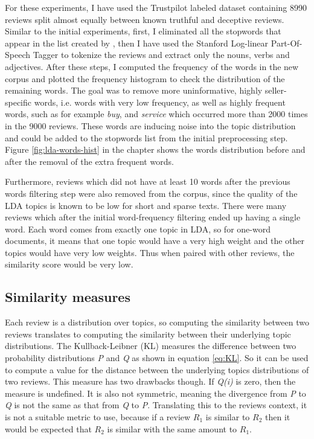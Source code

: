 For these experiments, I have used the Trustpilot labeled dataset containing 8990 reviews split almost equally between known truthful and deceptive reviews. Similar to the initial experiments, first, I eliminated all the stopwords that appear in the list created by  \citet{SaltonandBuckleyStopWordsAggresive}, then I have used the Stanford Log-linear Part-Of-Speech Tagger \citet{StanfordNLPTagger} to tokenize the reviews and extract only the nouns, verbs and adjectives. After these steps, I computed the frequency of the words in the new corpus and plotted the frequency histogram to check the distribution of the remaining words. The goal was to remove more uninformative, highly seller-specific words, i.e. words with very low frequency, as well as highly frequent words, such as for example \textit{buy},  and \textit{service} which occurred more than 2000 times in the 9000 reviews. These words are inducing noise into the topic distribution and could be added to the stopwords list from the initial preprocessing step. Figure \ref{fig:lda-words-hist} in the  chapter shows the words distribution before and after the removal of the extra frequent words. 

Furthermore, reviews which did not have at least 10 words after the previous words filtering step were also removed from the corpus, since the quality of the LDA topics is known to be low for short and sparse texts. There were many reviews which after the initial word-frequency filtering ended up having a single word. Each word comes from exactly one topic in LDA, so for one-word documents, it means that one topic would have a very high weight and the other topics would have very low weights. Thus when paired with other reviews, the similarity score would be very low. 

\subsection{Similarity measures}

Each review is a distribution over topics, so computing the similarity between two reviews translates to computing the similarity between their underlying topic distributions. The Kullback-Leibner (KL) \citet{Kullback1951} measures the difference between two probability distributions \textit{P} and \textit{Q} as shown in equation \ref{eq:KL}. So it can be used to compute a value for the distance between the underlying topics distributions of two reviews. This measure has two drawbacks though. If \textit{Q(i)} is zero, then the measure is undefined. It is also not symmetric, meaning the divergence from \textit{P} to \textit{Q} is not the same as that from \textit{Q} to \textit{P}. Translating this to the reviews context, it is not a suitable metric to use, because if a review \textit{$R_1$} is similar to \textit{$R_2$} then it would be expected that \textit{$R_2$} is similar with the same amount to \textit{$R_1$}.

